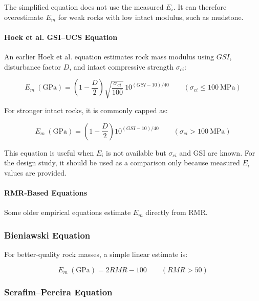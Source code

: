 \begin{warnbox}[Limitation]
The simplified equation does not use the measured \(E_i\). It can therefore overestimate
\(E_m\) for weak rocks with low intact modulus, such as mudstone.
\end{warnbox}

\paragraph{Hoek et al. GSI--UCS Equation}

An earlier Hoek et al. equation estimates rock mass modulus using \(GSI\), disturbance
factor \(D\), and intact compressive strength \(\sigma_{ci}\):

\[
E_m~(\text{GPa}) =
\left(1-\frac{D}{2}\right)
\sqrt{\frac{\sigma_{ci}}{100}}
\,
10^{(GSI-10)/40}
\qquad
(\sigma_{ci} \leq 100~\text{MPa})
\]

For stronger intact rocks, it is commonly capped as:

\[
E_m~(\text{GPa}) =
\left(1-\frac{D}{2}\right)
10^{(GSI-10)/40}
\qquad
(\sigma_{ci} > 100~\text{MPa})
\]

\begin{notebox}
This equation is useful when \(E_i\) is not available but \(\sigma_{ci}\) and GSI are known.
For the design study, it should be used as a comparison only because measured \(E_i\) values
are provided.
\end{notebox}

\paragraph{RMR-Based Equations}

Some older empirical equations estimate \(E_m\) directly from RMR.

\subsubsection{Bieniawski Equation}

For better-quality rock masses, a simple linear estimate is:

\[
E_m~(\text{GPa}) = 2RMR - 100
\qquad
(RMR > 50)
\]

\subsubsection{Serafim--Pereira Equation}

